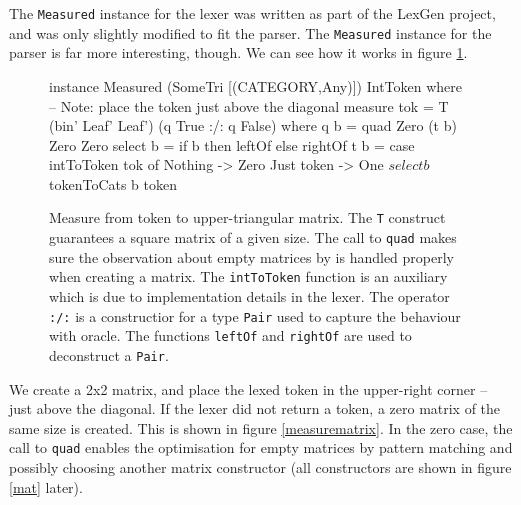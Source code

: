 \documentclass[a4paper,12pt,notitlepage]{report}
\begin{document}
The \texttt{Measured} instance for the lexer was written as part of the LexGen
project, and was only slightly modified to fit the parser. The \texttt{Measured}
instance for the parser is far more interesting, though. We can see how it works
in figure \ref{parsemeasure}.

\begin{figure}[H]
\begin{code}
instance Measured (SomeTri [(CATEGORY,Any)]) IntToken where
    -- Note: place the token just above the diagonal
    measure tok = T (bin' Leaf' Leaf') (q True :/: q False)
      where q b = quad Zero (t b) Zero Zero
            select b = if b then leftOf else rightOf
            t b = case intToToken tok of
                Nothing    -> Zero
                Just token -> One $ select b $ tokenToCats b token

\end{code}
\caption{\label{parsemeasure} \small Measure from token to upper-triangular
matrix. The \texttt{T} construct guarantees a square matrix of a given size. The
call to \texttt{quad} makes sure the observation about empty matrices by
\citet{parparsepaper} is handled properly when creating a matrix. The
\texttt{intToToken} function is an auxiliary which is due to implementation
details in the lexer. The operator \texttt{:/:} is a constructior for a type
\texttt{Pair} used to capture the behaviour with oracle. The functions
\texttt{leftOf} and \texttt{rightOf} are used to deconstruct a \texttt{Pair}.}
\end{figure}

We create a 2x2 matrix, and place the lexed token in the upper-right corner
-- just above the diagonal. If the lexer did not return a token, a zero matrix
of the same size is created. This is shown in figure \ref{measurematrix}. In the
zero case, the call to \texttt{quad} enables the optimisation for empty matrices
by pattern matching and possibly choosing another matrix constructor (all
constructors are shown in figure \ref{mat} later).
\end{document}
